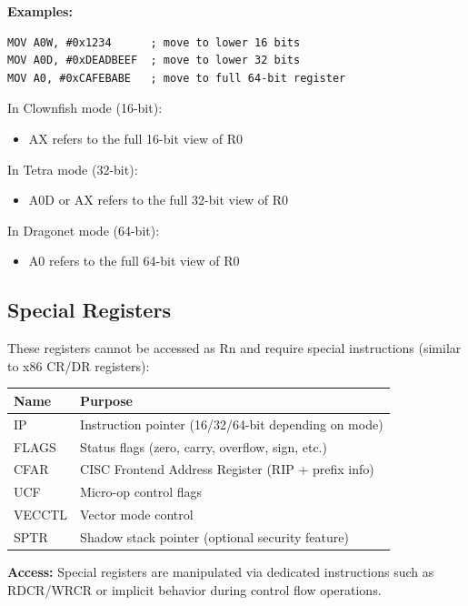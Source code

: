\documentclass[12pt]{article}
\begin{document}
\textbf{Examples:}

\begin{lstlisting}
MOV A0W, #0x1234      ; move to lower 16 bits
MOV A0D, #0xDEADBEEF  ; move to lower 32 bits
MOV A0, #0xCAFEBABE   ; move to full 64-bit register
\end{lstlisting}

In Clownfish mode (16-bit):
\begin{itemize}
    \item AX refers to the full 16-bit view of R0
\end{itemize}

In Tetra mode (32-bit):
\begin{itemize}
    \item A0D or AX refers to the full 32-bit view of R0
\end{itemize}

In Dragonet mode (64-bit):
\begin{itemize}
    \item A0 refers to the full 64-bit view of R0
\end{itemize}

\subsection{Special Registers}

These registers cannot be accessed as Rn and require special instructions (similar to x86 CR/DR registers):

\begin{table}[h]
\centering
\begin{tabular}{@{}ll@{}}
\toprule
\textbf{Name} & \textbf{Purpose} \\ \midrule
IP & Instruction pointer (16/32/64-bit depending on mode) \\
FLAGS & Status flags (zero, carry, overflow, sign, etc.) \\
CFAR & CISC Frontend Address Register (RIP + prefix info) \\
UCF & Micro-op control flags \\
VECCTL & Vector mode control \\
SPTR & Shadow stack pointer (optional security feature) \\ \bottomrule
\end{tabular}
\end{table}

\textbf{Access:} Special registers are manipulated via dedicated instructions such as RDCR/WRCR or implicit behavior during control flow operations.
\end{document}
